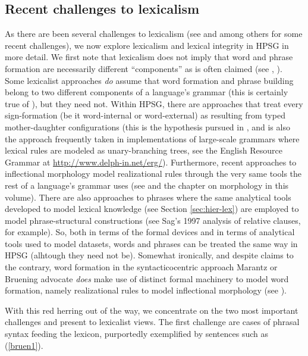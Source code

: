 \documentclass[output=paper]{langsci/langscibook}
\begin{document}
\subsection{Recent challenges to lexicalism}

As there are been several challenges to lexicalism (see \citet{Bruening2018} and  \citet{Haspelmath2011} among others for some recent challenges), we now explore lexicalism and lexical integrity in HPSG in more detail. We first note that lexicalism does not imply that word and phrase formation are necessarily different ``components'' as is often claimed (see \citealt{Marantz1997}, \citet{Bruening2018}). Some lexicalist approaches \emph{do} assume that word formation and phrase building belong to two different components of a language's grammar (this is certainly true of \citealt{Jackendoff75a}), but they need not. Within HPSG, there are approaches that treat every sign-formation (be it word-internal or word-external) as resulting from typed mother-daughter configurations (this is the hypothesis pursued in , and is also the approach frequently taken in implementations of large-scale grammars where lexical rules are modeled as unary-branching trees, see the English Resource Grammar at \url{http://www.delph-in.net/erg/}). Furthermore, recent approaches to inflectional morphology model realizational rules through the very same tools the rest of a language's grammar uses (see \citet{CrysmannandBonami2016} and the chapter on morphology in this volume).  There are also approaches to phrases where the same analytical tools developed to model lexical knowledge (see Section \ref{sec:hier-lex}) are employed to model phrase-structural constructions (see Sag's 1997 analysis of relative clauses, for example). So, both in terms of the formal devices and in terms of analytical tools used to model datasets, words and phrases can be treated the same way in HPSG (alhtough they need not be). Somewhat ironically, and despite claims to the contrary, word formation in the syntacticocentric approach Marantz or Bruening advocate \emph{does} make use of distinct formal machinery to model word formation, namely realizational rules to model inflectional morphology (see \citealt{HalleandMarantz1993}).

With this red herring out of the way, we concentrate on the two most important challenges \citet{Bruening2018} and \citet{Haspelmath2011} present to lexicalist views. The first challenge are cases of phrasal syntax feeding the lexicon, purportedly exemplified by sentences such as (\ref{bruen1}).
\end{document}
